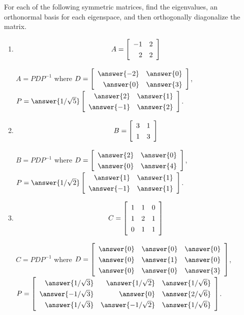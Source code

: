 \documentclass{ximera}
\begin{document}
\begin{problem}
  For each of the following symmetric matrices, find the eigenvalues,
  an orthonormal basis for each eigenspace, and then orthogonally
  diagonalize the matrix.
  \begin{enumerate}
    \item $$A = \startmat{rr}
      -1 & 2 \\
      2  & 2 \\
    \stopmat$$

    $A=PDP^{-1}$ where $D=\startmat{rr}
        \answer{-2} & \answer{0} \\
        \answer{0}  & \answer{3} \\
      \stopmat$,
      $P=\answer{1/\sqrt{5}}\startmat{rr}
        \answer{2}  & \answer{1} \\
        \answer{-1} & \answer{2} \\
      \stopmat$.



    \item $$B = \startmat{rr}
      3 & 1 \\
      1 & 3 \\
    \stopmat$$

      $B=PDP^{-1}$ where $D=\startmat{rr}
      \answer{2} & \answer{0} \\
      \answer{0} & \answer{4} \\
    \stopmat$,
    $P=\answer{1/\sqrt{2}}\startmat{rr}
      \answer{1}  & \answer{1} \\
      \answer{-1} & \answer{1} \\
    \stopmat$.


    
    \item $$C= \startmat{rrr}
      1 & 1 & 0 \\
      1 & 2 & 1 \\
      0 & 1 & 1 \\
    \stopmat$$

    $C=PDP^{-1}$ where
      $D=\startmat{rrr}
        \answer{0} & \answer{0} & \answer{0} \\
        \answer{0} & \answer{1} & \answer{0} \\
        \answer{0} & \answer{0} & \answer{3} \\
      \stopmat$,
      $\def\arraystretch{1.3}
      P=\startmat{rrr}
        \answer{1/\sqrt{3}} & \answer{1/\sqrt{2}} & \answer{1/\sqrt{6}} \\
        \answer{-1/\sqrt{3}} & \answer{0} & \answer{2/\sqrt{6}} \\
        \answer{1/\sqrt{3}} & \answer{-1/\sqrt{2}} & \answer{1/\sqrt{6}} \\
      \stopmat$.



\end{enumerate}
\end{problem}
\end{document}
